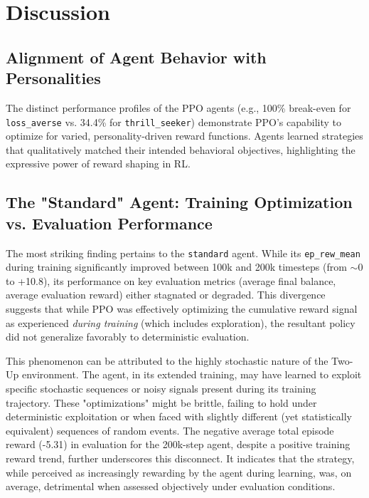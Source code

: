 \documentclass{article}
\begin{document}

\section{Discussion}

\subsection{Alignment of Agent Behavior with Personalities}
The distinct performance profiles of the PPO agents (e.g., 100\% break-even for \texttt{loss\_averse} vs. 34.4\% for \texttt{thrill\_seeker}) demonstrate PPO's capability to optimize for varied, personality-driven reward functions. Agents learned strategies that qualitatively matched their intended behavioral objectives, highlighting the expressive power of reward shaping in RL.

\subsection{The "Standard" Agent: Training Optimization vs. Evaluation Performance}
The most striking finding pertains to the \texttt{standard} agent. While its \texttt{ep\_rew\_mean} during training significantly improved between 100k and 200k timesteps (from \(\sim\)0 to +10.8), its performance on key evaluation metrics (average final balance, average evaluation reward) either stagnated or degraded. This divergence suggests that while PPO was effectively optimizing the cumulative reward signal as experienced \textit{during training} (which includes exploration), the resultant policy did not generalize favorably to deterministic evaluation.

This phenomenon can be attributed to the highly stochastic nature of the Two-Up environment. The agent, in its extended training, may have learned to exploit specific stochastic sequences or noisy signals present during its training trajectory. These "optimizations" might be brittle, failing to hold under deterministic exploitation or when faced with slightly different (yet statistically equivalent) sequences of random events. The negative average total episode reward (-5.31) in evaluation for the 200k-step agent, despite a positive training reward trend, further underscores this disconnect. It indicates that the strategy, while perceived as increasingly rewarding by the agent during learning, was, on average, detrimental when assessed objectively under evaluation conditions.
\end{document}
